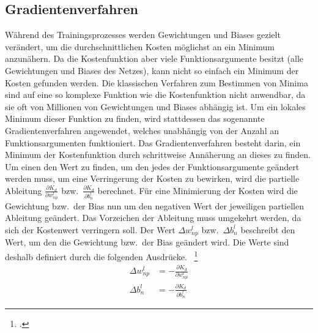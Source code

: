 \subsection{Gradientenverfahren}\label{subsec:gradientenverfahren}
Während des Trainingsprozesses werden Gewichtungen und Biases gezielt verändert, um die durchschnittlichen Kosten möglichst an ein Minimum anzunähern.
Da die Kostenfunktion aber viele Funktionsargumente besitzt (alle Gewichtungen und Biases des Netzes), kann nicht so einfach ein Minimum der Kosten gefunden werden.
Die klassischen Verfahren zum Bestimmen von Minima sind auf eine so komplexe Funktion wie die Kostenfunktion nicht anwendbar, da sie oft von Millionen von Gewichtungen und Biases abhängig ist.
Um ein lokales Minimum dieser Funktion zu finden, wird stattdessen das sogenannte Gradientenverfahren angewendet, welches unabhängig von der Anzahl an Funktionsargumenten funktioniert.
Das Gradientenverfahren besteht darin, ein Minimum der Kostenfunktion durch schrittweise Annäherung an dieses zu finden.
Um einen den Wert zu finden, um den jedes der Funktionsargumente geändert werden muss, um eine Verringerung der Kosten zu bewirken, wird die partielle Ableitung $\frac{\partial K_d}{\partial w^l_{n p}}$ bzw.~$\frac{\partial K_d}{\partial b^l_n}$ berechnet.
Für eine Minimierung der Kosten wird die Gewichtung bzw.~der Bias nun um den negativen Wert der jeweiligen partiellen Ableitung geändert.
Das Vorzeichen der Ableitung muss umgekehrt werden, da sich der Kostenwert verringern soll.
Der Wert $\Delta w^l_{n p}$ bzw.~$\Delta b^l_n$ beschreibt den Wert, um den die Gewichtung bzw.~der Bias geändert wird.
Die Werte sind deshalb definiert durch die folgenden Ausdrücke.
~\footcite{3b1b-2,weitz}
\begin{align}
    \Delta w^l_{n p} &= -\frac{\partial K_d}{\partial w^l_{n p}}
    \label{eq:delta-w}\\
    \Delta b^l_n &= -\frac{\partial K_d}{\partial b^l_n}
    \label{eq:delta-b}
\end{align}

